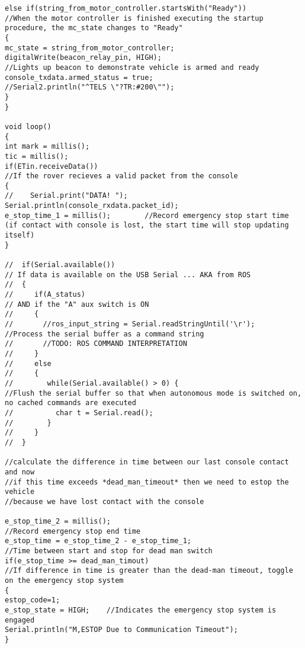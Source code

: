 \begin{lstlisting}[breaklines=true,basicstyle=\tiny]
else if(string_from_motor_controller.startsWith("Ready"))                                     //When the motor controller is finished executing the startup procedure, the mc_state changes to "Ready"
{
mc_state = string_from_motor_controller;
digitalWrite(beacon_relay_pin, HIGH);                                                       //Lights up beacon to demonstrate vehicle is armed and ready
console_txdata.armed_status = true;
//Serial2.println("^TELS \"?TR:#200\"");
}
}

void loop()                                                                                     
{
int mark = millis();
tic = millis();
if(ETin.receiveData())                                                                         //If the rover recieves a valid packet from the console
{
//    Serial.print("DATA! "); Serial.println(console_rxdata.packet_id);
e_stop_time_1 = millis();        //Record emergency stop start time (if contact with console is lost, the start time will stop updating itself)
}

//  if(Serial.available())                                                                        // If data is available on the USB Serial ... AKA from ROS
//  {
//     if(A_status)                                                                   // AND if the "A" aux switch is ON
//     {
//       //ros_input_string = Serial.readStringUntil('\r');                                         //Process the serial buffer as a command string
//       //TODO: ROS COMMAND INTERPRETATION
//     }
//     else
//     {
//        while(Serial.available() > 0) {                                                         //Flush the serial buffer so that when autonomous mode is switched on, no cached commands are executed
//          char t = Serial.read();
//        }
//     }
//  }

//calculate the difference in time between our last console contact and now
//if this time exceeds *dead_man_timeout* then we need to estop the vehicle
//because we have lost contact with the console

e_stop_time_2 = millis();                                                                     //Record emergency stop end time                   
e_stop_time = e_stop_time_2 - e_stop_time_1;                                                  //Time between start and stop for dead man switch 
if(e_stop_time >= dead_man_timout)                                                            //If difference in time is greater than the dead-man timeout, toggle on the emergency stop system
{
estop_code=1;
e_stop_state = HIGH;    //Indicates the emergency stop system is engaged
Serial.println("M,ESTOP Due to Communication Timeout");
}


\end{lstlisting}
